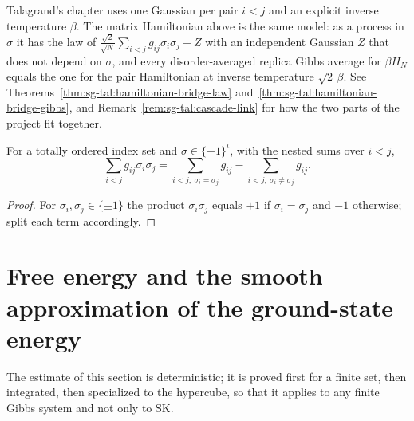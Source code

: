 \begin{remark}\label{rem:sg:pair-bridge}
Talagrand's chapter uses one Gaussian per pair $i<j$ and an explicit inverse temperature $\beta$. The matrix Hamiltonian above is the same model:
as a process in $\sigma$ it has the law of $\frac{\sqrt2}{\sqrt N}\sum_{i<j}g_{ij}\sigma_i\sigma_j+Z$ with an independent Gaussian $Z$ that does not depend on $\sigma$,
and every disorder-averaged replica Gibbs average for $\beta H_N$ equals the one for the pair Hamiltonian at inverse temperature $\sqrt2\,\beta$.
See Theorems~\ref{thm:sg-tal:hamiltonian-bridge-law} and~\ref{thm:sg-tal:hamiltonian-bridge-gibbs}, and Remark~\ref{rem:sg-tal:cascade-link} for how the two parts of the project fit together.
\end{remark}

\begin{lemma}\label{lem:sg:comfort}
  \leanok
For a totally ordered index set and $\sigma\in\{\pm1\}^\iota$, with the nested sums over $i<j$,
\[\sum_{i<j}g_{ij}\sigma_i\sigma_j=\sum_{i<j,\ \sigma_i=\sigma_j}g_{ij}-\sum_{i<j,\ \sigma_i\ne\sigma_j}g_{ij}.\]
\end{lemma}

\begin{proof}
  \leanok
For $\sigma_i,\sigma_j\in\{\pm1\}$ the product $\sigma_i\sigma_j$ equals $+1$ if $\sigma_i=\sigma_j$ and $-1$
otherwise; split each term accordingly.
\end{proof}

\section{Free energy and the smooth approximation of the ground-state energy}\label{sec:sg:free}

The estimate of this section is deterministic; it is proved first for a finite set, then integrated, then specialized
to the hypercube, so that it applies to any finite Gibbs system and not only to SK.

